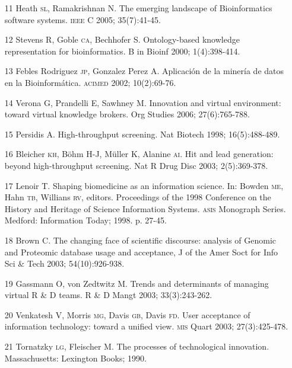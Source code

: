 \documentclass{article}
\begin{document}
\begin{itemize}
\item[11] Heath \textsc{sl}, Ramakrishnan N. The emerging landscape of Bioinformatics
software systems. \textsc{ieee} C 2005; 35(7):41-45.

\item[12] Stevens R, Goble \textsc{ca}, Bechhofer S. Ontology-based knowledge
representation for bioinformatics. B in Bioinf 2000; 1(4):398-414.

\item[13] Febles Rodriguez \textsc{jp}, Gonzalez Perez A. Aplicación de la minería de
datos en la Bioinformática. \textsc{acimed} 2002; 10(2):69-76.

\item[14] Verona G, Prandelli E, Sawhney M. Innovation and virtual
environment: toward virtual knowledge brokers. Org Studies 2006; 27(6):765-788.

\item[15] Persidis A. High-throughput screening. Nat Biotech 1998;
16(5):488-489.

\item[] 16 Bleicher \textsc{kh}, Böhm H-J, Müller K, Alanine \textsc{ai}. Hit and lead generation:
beyond high-throughput screening. Nat R Drug Disc 2003; 2(5):369-378.

\item[17] Lenoir T. Shaping biomedicine as an information science. In:
Bowden \textsc{me}, Hahn \textsc{tb}, Willians \textsc{rv}, editors. Proceedings of the 1998 Conference on
the History and Heritage of Science Information Systems. \textsc{asis} Monograph Series.
Medford: Information Today; 1998. p. 27-45.

\item[18] Brown C. The changing face of scientific discourse: analysis of
Genomic and Proteomic database usage and acceptance, J of the Amer Soct for Info
Sci \& Tech 2003; 54(10):926-938.

\item[19] Gassmann O, von Zedtwitz M. Trends and determinants of managing
virtual R \& D teams. R \& D Mangt 2003; 33(3):243-262.

\item[20] Venkatesh V, Morris \textsc{mg}, Davis \textsc{gb}, Davis \textsc{fd}. User acceptance of
information technology: toward a unified view. \textsc{mis} Quart 2003; 27(3):425-478.

\item[21] Tornatzky \textsc{lg}, Fleischer M. The processes of technological
innovation. Massachusetts: Lexington Books; 1990.


\end{itemize}
\end{document}
